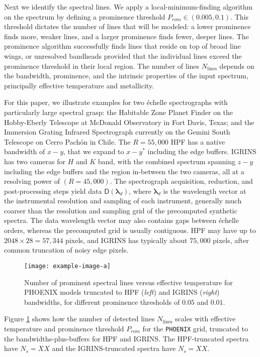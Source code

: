 \documentclass[modern]{aastex631}
\begin{document}
Next we identify the spectral lines.  We apply a local-minimum-finding algorithm on the spectrum by defining a prominence threshold $P_{rom} \in (0.005, 0.1)$.  This threshold dictates the number of lines that will be modeled: a lower prominence finds more, weaker lines, and a larger prominence finds fewer, deeper lines.  The prominence algorithm successfully finds lines that reside on top of broad line wings, or unresolved bandheads provided that the individual lines exceed the prominence threshold in their local region.  The number of lines $N_{\mathrm{lines}}$ depends on the bandwidth, prominence, and the intrinsic properties of the input spectrum, principally effective temperature and metallicity.

For this paper, we illustrate examples for two \'echelle spectrographs with particularly large spectral grasp: the Habitable Zone Planet Finder \citep[HPF,][]{2014SPIE.9147E..1GM} on the Hobby-Eberly Telescope at McDonald Observatory in Fort Davis, Texas; and the Immersion Grating Infrared Spectrograph \citep[IGRINS,][]{park14}
currently on the Gemini South Telescope on Cerro Pach\'on in Chile.  The $R=55,000$ HPF has a native bandwidth of $x-y$, that we expand to $x-y^*$ including the edge buffers.  IGRINS has two cameras for $H$ and $K$ band, with the combined spectrum spanning $z-y$ including the edge buffers and the region in-between the two cameras, all at a resolving power of $(R=45,000)$.  The spectrograph acquisition, reduction, and post-processing steps yield data $\mathsf{D}(\bm{\lambda}_{d})$, where $\bm{\lambda}_{d}$ is the wavelength vector at the instrumental resolution and sampling of each instrument, generally much coarser than the resolution and sampling grid of the precomputed synthetic spectra.  The data wavelength vector may also contains gaps between \'echelle orders, whereas the precomputed grid is usually contiguous.  HPF may have up to $2048\times28=57,344$ pixels, and IGRINS has typically about $75,000$ pixels, after common truncation of noisy edge pixels.


\begin{figure}[hbt!]
  \centering
  \texttt{[image: example-image-a]}
  \caption{Number of prominent spectral lines versus effective temperature for PHOENIX models truncated to HPF (\emph{left}) and IGRINS (\emph{right}) bandwidths, for different prominence thresholds of $0.05$ and $0.01$.}
  \label{fig_Nlines_vs_teff}
\end{figure}


Figure \ref{fig_Nlines_vs_teff} shows how the number of detected lines $N_{\mathrm{lines}}$ scales with effective temperature and prominence threshold $P_{rom}$ for the \texttt{PHOENIX} grid, truncated to the bandwidths-plus-buffers for HPF and IGRINS.  The HPF-truncated spectra have $N_s=XX$ and the IGRINS-truncated spectra have $N_s=XX$.
\end{document}

